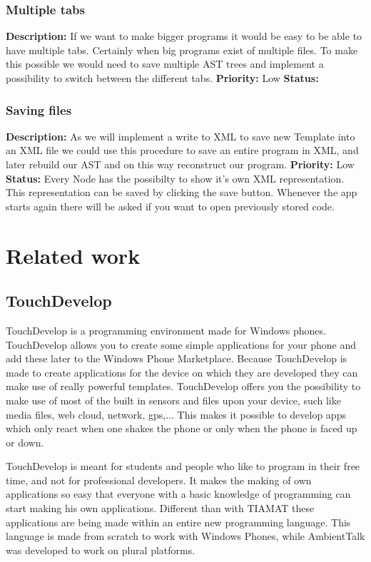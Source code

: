 \documentclass[a4paper,12pt]{report}
\begin{document}
\subsection{Multiple tabs}
\textbf{Description: } If we want to make bigger programs it would be easy to be able to have multiple tabs. Certainly when big programs exist of multiple files. To make this possible we would need
to save multiple AST trees and implement a possibility to switch between the different tabs.\newline
\textbf{Priority:} Low \newline
\textbf{Status: }
\subsection{Saving files}
\textbf{Description: } As we will implement a write to XML to save new Template into an XML file we could use this procedure to save an entire program in XML, and later rebuild our AST and on this way 
reconstruct our program. \newline
\textbf{Priority:} Low \newline
\textbf{Status: } Every Node has the possibilty to show it's own XML representation. This representation can be saved by clicking the save button. Whenever the app starts again there will be asked if you want to open
previously stored code.


\chapter{Related work}
\section{TouchDevelop}
TouchDevelop is a programming environment made for Windows phones. TouchDevelop allows you to create some simple applications for your phone and add these later to the Windows Phone Marketplace. 
Because TouchDevelop is made to create applications for the device on which they are developed they can make use of really powerful templates. TouchDevelop offers you the possibility to make use 
of most of the built in sensors and files upon your device, such like media files, web cloud, network, gps,... This makes it possible to develop apps which only react when one shakes the phone or
only when the phone is faced up or down.

TouchDevelop is meant for students and people who like to program in their free time, and not for professional developers. It makes the making of own applications so easy that everyone with a 
basic knowledge of programming can start making his own applications. Different than with TIAMAT these applications are being made within an entire new programming language. This language
is made from scratch to work with Windows Phones, while AmbientTalk was developed to work on plural platforms.
\end{document}
